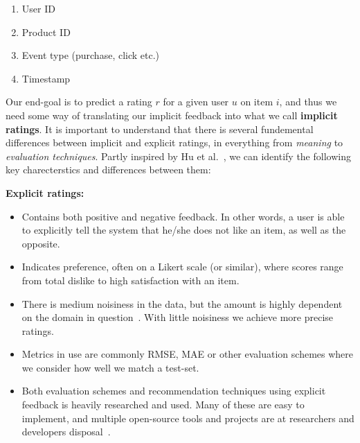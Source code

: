 \begin{enumerate}
  \item User ID
  \item Product ID
  \item Event type (purchase, click etc.)
  \item Timestamp
\end{enumerate}

Our end-goal is to predict a rating $r$ for a given user $u$ on item $i$, and
thus we need some way of translating our implicit feedback into what we call
\textbf{implicit ratings}. It is important to understand that there is several
fundemental differences between implicit and explicit ratings, in everything
from \textit{meaning} to \textit{evaluation techniques}. Partly inspired by Hu
et al.~\cite{Hu2008}, we can identify the following key charecterstics and
differences between them:

\textbf{Explicit ratings:}
\begin{itemize}
\item Contains both positive and negative feedback. In other words, a user is
able to explicitly tell the system that he/she does not like an item, as well
as the opposite.
\item Indicates preference, often on a Likert scale (or similar), where scores
range from total dislike to high satisfaction with an item.
\item There is medium noisiness in the data, but the amount is highly dependent
on the domain in question~\cite{amatriain2009like}. With little noisiness we
achieve more precise ratings.
\item Metrics in use are commonly RMSE, MAE or other evaluation schemes where
we consider how well we match a test-set.
\item Both evaluation schemes and recommendation techniques using explicit
feedback is heavily researched and used. Many of these are easy to implement,
and multiple open-source tools and projects are at researchers and developers
disposal~\cite{something}.
\end{itemize}

